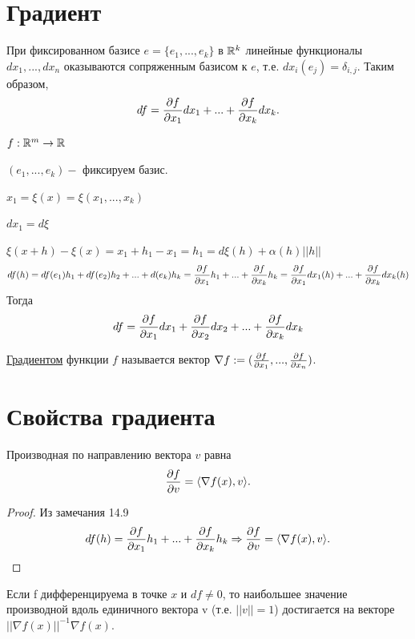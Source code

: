     \section{Градиент}
    
    \begin{mention}
    	При фиксированном базисе $e = \{e_1, ..., e_k\}$ в $\mathbb R^k$ линейные функционалы $dx_1, ..., dx_n$ оказываются сопряженным базисом к $e$, т.е. $dx_i(e_j) = \delta_{i,j}$. Таким образом,
    	\[ df = \frac{\partial f}{\partial x_1} dx_1 + ... + \frac{\partial f}{\partial x_k} dx_k. \]
    \end{mention}
    
    \begin{explanation}
	    $f: \mathbb R^m \rightarrow \mathbb R$
	    
	    $(e_1, ..., e_k) -$ фиксируем базис.
	    
	    $x_1 = \xi(x) = \xi(x_1, ..., x_k)$
	    
	    $dx_1 = d\xi$
	    
	    $\xi(x + h) - \xi(x) = x_1 + h_1 - x_1 = h_1 = d\xi(h) + \alpha(h) ||h||$
	    \[ df(h) = df(e_1) h_1 + df(e_2) h_2 + ... + d(e_k) h_k = \frac{\partial f}{\partial x_1}h_1 + ... + \frac{\partial f}{\partial x_k}h_k = \frac{\partial f}{\partial x_1} dx_1(h) + ... + \frac{\partial f}{\partial x_k} dx_k(h) \]    
	    Тогда	    
	    \[ df = \frac{\partial f}{\partial x_1} dx_1 + \frac{\partial f}{\partial x_2} dx_2 + ... + \frac{\partial f}{\partial x_k} dx_k \]
    \end{explanation}
    
    \begin{definition}
    	\underline{Градиентом} функции $f$ называется вектор $\nabla f := (\frac{\partial f}{\partial x_1}, ..., \frac{\partial f}{\partial x_n})$.
    \end{definition}
    
    \section{Свойства градиента}
    
    \begin{sentence}
    	Производная по направлению вектора $v$ равна
        \[ \frac{\partial f}{\partial v} = \langle \nabla f(x), v \rangle. \]
    \end{sentence}
    
    \begin{proof}    
	    Из замечания 14.9
	    \[ df(h) = \frac{\partial f}{\partial x_1}h_1 + ... + \frac{\partial f}{\partial x_k}h_k \Rightarrow \frac{\partial f}{\partial v} = \langle \nabla f(x), v \rangle. \]
    \end{proof}
    
    \begin{lemma}
    	Если f дифференцируема в точке $x$ и $df \neq 0$, то наибольшее значение производной вдоль единичного вектора v (т.е. $||v|| = 1$) достигается на векторе $||\nabla f(x)||^{-1} \nabla f(x).$
    \end{lemma}
    
